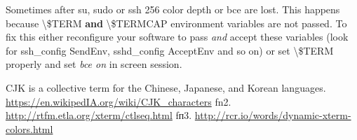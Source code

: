 \documentclass[10pt, a5paper]{article}
\begin{document}
Sometimes after su, sudo or ssh 256 color depth or bce are lost. This happens because \textbackslash{}\$TERM \textbf{and} \textbackslash{}\$TERMCAP environment variables are not passed. To fix this either reconfigure your software to pass \emph{and} accept these variables (look for ssh\_config SendEnv, sshd\_config AcceptEnv and so on) or set \textbackslash{}\$TERM properly and set \emph{bce on} in screen session.

\begin{thebibliography}{99}
 CJK is a collective term for the Chinese, Japanese, and Korean languages. \url{https://en.wikipedIA.org/wiki/CJK_characters} 
 fn2. \url{http://rtfm.etla.org/xterm/ctlseq.html}
 fп3. \url{http://rcr.io/words/dynamic-xterm-colors.html}
\end{thebibliography}
\end{document}

